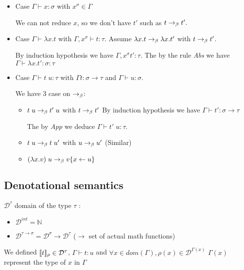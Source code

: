   \begin{itemize}
    \item Case $\Gamma \vdash x : \sigma$ with $x^\sigma \in \Gamma$
      
      We can not reduce $x$, so we don't have $t'$ such as $t\to_\beta t'.$

    \item Case $\Gamma \vdash \lambda x.t$ with $\Gamma, x^\sigma \vdash t :
      \tau$. Assume $\lambda x. t \to_\beta \lambda x. t'$ with $t \to_\beta t'$.

      By induction hypothesis we have $\Gamma, x^\sigma t' : \tau$. The by the
      rule \textit{Abs} we have $\Gamma \vdash \lambda x. t' : \sigma : \tau$

    \item Case $\Gamma \vdash t\;u: \tau$ with $\Gamma t : \sigma \to \tau$ and
      $\Gamma \vdash u : \sigma$.

      We have 3 case on $\to_\beta$:

      \begin{itemize}
        \item $t\;u \to_\beta t'\;u$ with $t \to_\beta t'$ 
          By induction hypothesis we have $\Gamma \vdash t' : \sigma \to \tau$

          The by \textit{App} we deduce $\Gamma \vdash t'\;u: \tau$.

        \item $t\;u \to_\beta t\;u'$ with $u \to_\beta  u'$ (Similar)

        \item $(\lambda x.v)\; u \to_\beta v\{x \leftarrow u\}$
      \end{itemize}
  \end{itemize}
  \qedsymbol

  \subsection{Denotational semantics}

    $\mathcal D^\tau$ domain of the type $\tau$ :

    \begin{itemize}
      \item $\mathcal D^{int} = \mathbb N$
      \item $\mathcal D^{\tau \to \sigma} = \mathcal D^\sigma \to \mathcal
        D^\tau$ ($\to$ set of actual math functions)
    \end{itemize}

    We defined $\llbracket t \rrbracket_\rho \in \mathcal D^\tau$, $\Gamma \vdash t : u$
    and $\forall x\in dom(\Gamma), \rho(x) \in \mathcal D^{\Gamma(x)}$
    $\Gamma(x)$ represent the type of $x$ in $\Gamma$

